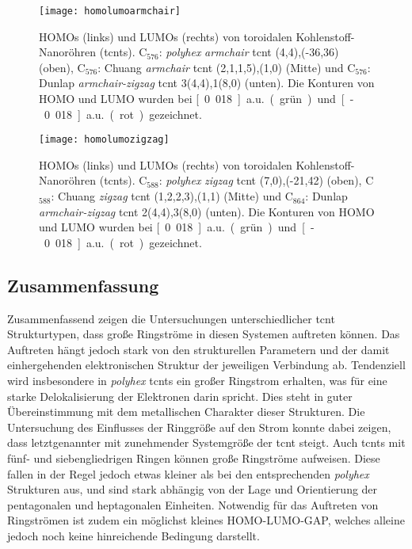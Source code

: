 \begin{figure}[ht!]
	\centering
	\texttt{[image: homolumoarmchair]}
	\captionsetup{figurewithin = chapter}
	\captionsetup{font=small, labelfont=bf}\caption[HOMO und LUMO von toroidalen Kohlenstoff-Nanoröhren 1]{HOMOs (links) und LUMOs (rechts) von toroidalen Kohlenstoff-Nanoröhren (\acp{tcnt}). C$_{576}$: \textit{polyhex} \textit{armchair} \ac{tcnt} (4,4),(-36,36) (oben), C$_{576}$: Chuang \textit{armchair} \ac{tcnt} (2,1,1,5),(1,0) (Mitte) und C$_{576}$: Dunlap \textit{armchair-zigzag} \ac{tcnt} 3(4,4),1(8,0) (unten). Die Konturen von HOMO und LUMO wurden bei \unit[0.018]{a.u.} (grün) und \unit[-0.018]{a.u.} (rot) gezeichnet.}
\label{abb:homolumoarmchair}
\end{figure}

\begin{figure}[ht!]
	\centering
	\texttt{[image: homolumozigzag]}
	\captionsetup{figurewithin = chapter}
	\captionsetup{font=small, labelfont=bf}\caption[HOMO und LUMO von toroidalen Kohlenstoff-Nanoröhren 2]{HOMOs (links) und LUMOs (rechts) von toroidalen Kohlenstoff-Nanoröhren (\acp{tcnt}). C$_{588}$: \textit{polyhex} \textit{zigzag} \ac{tcnt} (7,0),(-21,42) (oben), C$_{588}$: Chuang \textit{zigzag} \ac{tcnt} (1,2,2,3),(1,1) (Mitte) und C$_{864}$: Dunlap \textit{armchair-zigzag} \ac{tcnt} 2(4,4),3(8,0) (unten). Die Konturen von HOMO und LUMO wurden bei \unit[0.018]{a.u.} (grün) und \unit[-0.018]{a.u.} (rot) gezeichnet.}
\label{abb:homolumozigzag}
\end{figure}

\FloatBarrier
\subsection{Zusammenfassung}
Zusammenfassend zeigen die Untersuchungen unterschiedlicher \ac{tcnt} Strukturtypen, dass große Ringströme in diesen Systemen auftreten können. Das Auftreten hängt jedoch stark von den strukturellen Parametern und der damit einhergehenden elektronischen Struktur der jeweiligen Verbindung ab. Tendenziell wird insbesondere in \textit{polyhex} \acp{tcnt} ein großer Ringstrom erhalten, was für eine starke Delokalisierung der Elektronen darin spricht. Dies steht in guter Übereinstimmung mit dem metallischen Charakter dieser Strukturen. Die Untersuchung des Einflusses der Ringgröße auf den Strom konnte dabei zeigen, dass letztgenannter mit zunehmender Systemgröße der \ac{tcnt} steigt. Auch \acp{tcnt} mit fünf- und siebengliedrigen Ringen können große Ringströme aufweisen. Diese fallen in der Regel jedoch etwas kleiner als bei den entsprechenden \textit{polyhex} Strukturen aus, und sind stark abhängig von der Lage und Orientierung der pentagonalen und heptagonalen Einheiten. Notwendig für das Auftreten von Ringströmen ist zudem ein möglichst kleines HOMO-LUMO-GAP, welches alleine jedoch noch keine hinreichende Bedingung darstellt.

